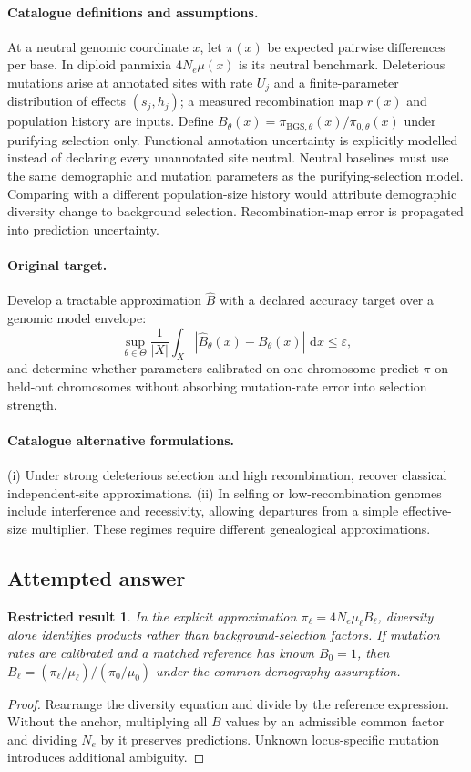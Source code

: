 \documentclass[11pt]{article}
\newcommand{\dd}{\,\mathrm d}
\newtheorem{attemptresult}{Restricted result}[section]
\begin{document}
\paragraph{Catalogue definitions and assumptions.}
At a neutral genomic coordinate $x$, let $\pi(x)$ be expected pairwise differences per base. In diploid panmixia $4N_e\mu(x)$ is its neutral benchmark. Deleterious mutations arise at annotated sites with rate $U_j$ and a finite-parameter distribution of effects $(s_j,h_j)$; a measured recombination map $r(x)$ and population history are inputs. Define $B_\theta(x)=\pi_{\mathrm{BGS},\theta}(x)/\pi_{0,\theta}(x)$ under purifying selection only. Functional annotation uncertainty is explicitly modelled instead of declaring every unannotated site neutral. Neutral baselines must use the same demographic and mutation parameters as the purifying-selection model. Comparing with a different population-size history would attribute demographic diversity change to background selection. Recombination-map error is propagated into prediction uncertainty.
\paragraph{Original target.}
Develop a tractable approximation $\widehat B$ with a declared accuracy target over a genomic model envelope:
\[
 \sup_{\theta\in\Theta}\frac1{|X|}
 \int_X |\widehat B_\theta(x)-B_\theta(x)|\,\dd x\le\varepsilon,
\]
and determine whether parameters calibrated on one chromosome predict $\pi$ on held-out chromosomes without absorbing mutation-rate error into selection strength.
\paragraph{Catalogue alternative formulations.}
(i) Under strong deleterious selection and high recombination, recover classical independent-site approximations. (ii) In selfing or low-recombination genomes include interference and recessivity, allowing departures from a simple effective-size multiplier. These regimes require different genealogical approximations.
\subsection{Attempted answer}
\begin{attemptresult}
In the explicit approximation $\pi_\ell=4N_e\mu_\ell B_\ell$, diversity alone identifies products rather than background-selection factors. If mutation rates are calibrated and a matched reference has known $B_0=1$, then $B_\ell=(\pi_\ell/\mu_\ell)/(\pi_0/\mu_0)$ under the common-demography assumption.
\end{attemptresult}
\begin{proof}
Rearrange the diversity equation and divide by the reference expression. Without the anchor, multiplying all $B$ values by an admissible common factor and dividing $N_e$ by it preserves predictions. Unknown locus-specific mutation introduces additional ambiguity.
\end{proof}
\end{document}
